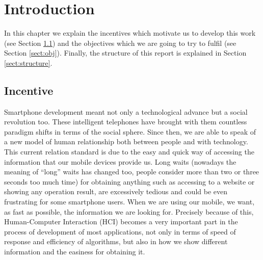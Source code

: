 \chapter{Introduction}
\label{cap:introduccion}


In this chapter we explain the incentives which motivate us to develop this work (see Section \ref{sect:motiv}) and the objectives which we are going to try to fulfil (see Section \ref{sect:obj}). Finally, the structure of this report is explained in Section \ref{sect:structure}.

\section{Incentive}\label{sect:motiv}
Smartphone development meant not only a technological advance but a social revolution too. These intelligent telephones have brought with them countless paradigm shifts in terms of the social sphere. Since then, we are able to speak of a new model of human relationship both between people and with technology. This current relation standard is due to the easy and quick way of accessing the information that our mobile devices provide us. Long waits (nowadays the meaning of ``long'' waits has changed too, people consider more than two or three seconds too much time) for obtaining anything such as accessing to a website or showing any operation result, are excessively tedious and could be even frustrating for some smartphone users. When we are using our mobile, we want, as fast as possible, the information we are looking for. Precisely because of this, Human-Computer Interaction (HCI) becomes a very important part in the process of development of most applications, not only in terms of speed of response and efficiency of algorithms, but also in how we show different information and the easiness for obtaining it.


